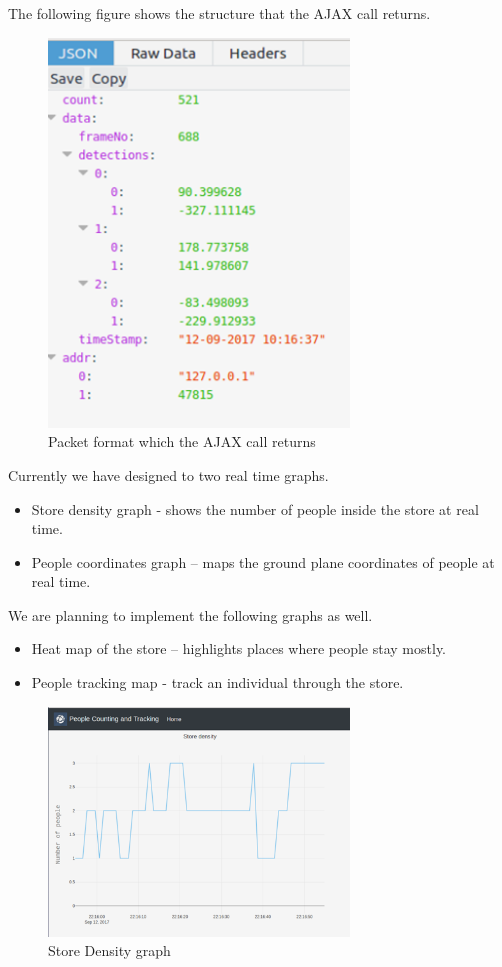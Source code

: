 \documentclass[12pt,a4paper]{report}
\begin{document}
\par The following figure shows the structure that the AJAX call returns.
\begin{figure}[H]
\includegraphics[width=8cm]{pak2.png}
\centering
\caption{Packet format which the AJAX call returns}
\label{pak2}
\end{figure}


Currently we have designed to two real time graphs.
\begin{itemize}
\item Store density graph - shows the number of people inside the store at real 	time.	
\item People 	coordinates graph – maps the ground plane coordinates of people at 	real time.
\end{itemize}

We are planning to implement the following graphs as well.
\begin{itemize}
\item Heat map 	of the store – highlights places where people stay mostly.
\item People 	tracking map - track an individual through the store.
\end{itemize}

\begin{figure}[H]
\includegraphics[width=8cm]{graph2.png}
\centering
\caption{Store Density graph}
\label{graph2}
\end{figure}
\end{document}
